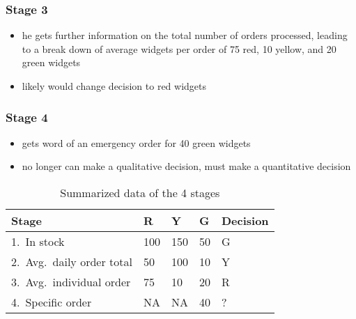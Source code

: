 \documentclass[../jaynes_prob_theory_notes.tex]{subfiles}
\begin{document}
                \subsubsection{Stage 3}
                    \begin{itemize} 
                        \item he gets further information on the total number of orders processed, leading to a break down of average widgets per order of 75 red, 10 yellow, and 20 green widgets
                        \item likely would change decision to red widgets
                    \end{itemize}

                \subsubsection{Stage 4}
                    \begin{itemize} 
                        \item gets word of an emergency order for 40 green widgets
                        \item no longer can make a qualitative decision, must make a quantitative decision
                    \end{itemize}

                    \begin{table}[]
                        \centering
                        \caption{Summarized data of the 4 stages}
                            \begin{tabular}{lllll}
                                \textbf{Stage}          & \textbf{R}   & \textbf{Y}   & \textbf{G}  & \textbf{Decision} \\
                                \toprule
                                1.\ In stock                & 100 & 150 & 50 & G        \\
                                2.\ Avg.\ daily order total & 50  & 100 & 10 & Y        \\
                                3.\ Avg.\ individual order  & 75  & 10  & 20 & R        \\
                                4.\ Specific order          & NA  & NA  & 40 &?\        \\
                                \bottomrule
                            \end{tabular}
                    \end{table}
\end{document}
